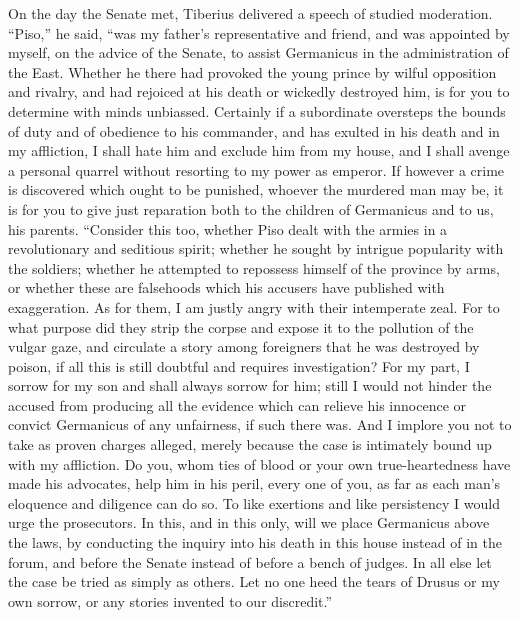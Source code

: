 On the day the Senate met, Tiberius delivered a speech of studied moderation. ``Piso,'' he said, ``was my father's representative and friend, and was appointed by myself, on the advice of the Senate, to assist Germanicus in the administration of the East. Whether he there had provoked the young prince by wilful opposition and rivalry, and had rejoiced at his death or wickedly destroyed him, is for you to determine with minds unbiassed. Certainly if a subordinate oversteps the bounds of duty and of obedience to his commander, and has exulted in his death and in my affliction, I shall hate him and exclude him from my house, and I shall avenge a personal quarrel without resorting to my power as emperor. If however a crime is discovered which ought to be punished, whoever the murdered man may be, it is for you to give just reparation both to the children of Germanicus and to us, his parents. ``Consider this too, whether Piso dealt with the armies in a revolutionary and seditious spirit; whether he sought by intrigue popularity with the soldiers; whether he attempted to repossess himself of the province by arms, or whether these are falsehoods which his accusers have published with exaggeration. As for them, I am justly angry with their intemperate zeal. For to what purpose did they strip the corpse and expose it to the pollution of the vulgar gaze, and circulate a story among foreigners that he was destroyed by poison, if all this is still doubtful and requires investigation? For my part, I sorrow for my son and shall always sorrow for him; still I would not hinder the accused from producing all the evidence which can relieve his innocence or convict Germanicus of any unfairness, if such there was. And I implore you not to take as proven charges alleged, merely because the case is intimately bound up with my affliction. Do you, whom ties of blood or your own true-heartedness have made his advocates, help him in his peril, every one of you, as far as each man's eloquence and diligence can do so. To like exertions and like persistency I would urge the prosecutors. In this, and in this only, will we place Germanicus above the laws, by conducting the inquiry into his death in this house instead of in the forum, and before the Senate instead of before a bench of judges. In all else let the case be tried as simply as others. Let no one heed the tears of Drusus or my own sorrow, or any stories invented to our discredit.''



